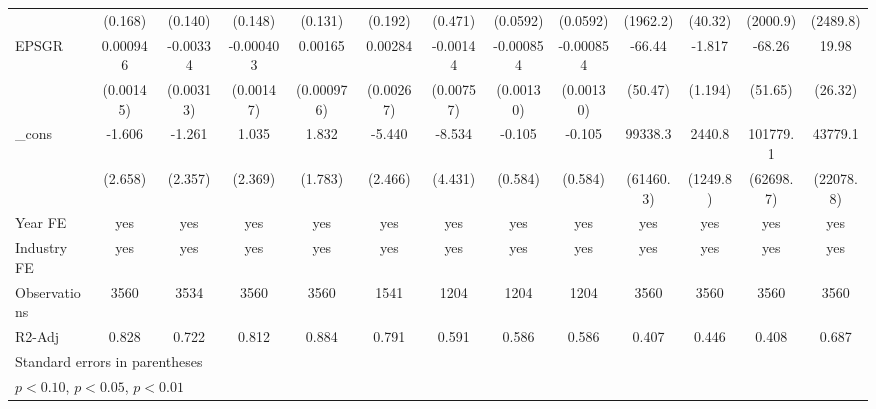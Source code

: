 \begin{table}[htbp]
\begin{tabular}{l*{12}{c}}
                    &     (0.168)         &     (0.140)         &     (0.148)         &     (0.131)         &     (0.192)         &     (0.471)         &    (0.0592)         &    (0.0592)         &    (1962.2)         &     (40.32)         &    (2000.9)         &    (2489.8)         \\
EPSGR               &    0.000946         &    -0.00334         &   -0.000403         &     0.00165         &     0.00284         &    -0.00144         &   -0.000854         &   -0.000854         &      -66.44         &      -1.817         &      -68.26         &       19.98         \\
                    &   (0.00145)         &   (0.00313)         &   (0.00147)         &  (0.000976)         &   (0.00267)         &   (0.00757)         &   (0.00130)         &   (0.00130)         &     (50.47)         &     (1.194)         &     (51.65)         &     (26.32)         \\
\_cons              &      -1.606         &      -1.261         &       1.035         &       1.832         &      -5.440\sym{**} &      -8.534\sym{*}  &      -0.105         &      -0.105         &     99338.3         &      2440.8\sym{*}  &    101779.1         &     43779.1\sym{*}  \\
                    &     (2.658)         &     (2.357)         &     (2.369)         &     (1.783)         &     (2.466)         &     (4.431)         &     (0.584)         &     (0.584)         &   (61460.3)         &    (1249.8)         &   (62698.7)         &   (22078.8)         \\
\hline
Year FE             &         yes         &         yes         &         yes         &         yes         &         yes         &         yes         &         yes         &         yes         &         yes         &         yes         &         yes         &         yes         \\
Industry FE         &         yes         &         yes         &         yes         &         yes         &         yes         &         yes         &         yes         &         yes         &         yes         &         yes         &         yes         &         yes         \\
Observations        &        3560         &        3534         &        3560         &        3560         &        1541         &        1204         &        1204         &        1204         &        3560         &        3560         &        3560         &        3560         \\
R2-Adj              &       0.828         &       0.722         &       0.812         &       0.884         &       0.791         &       0.591         &       0.586         &       0.586         &       0.407         &       0.446         &       0.408         &       0.687         \\
\hline\hline
\multicolumn{13}{l}{\footnotesize Standard errors in parentheses}\\
\multicolumn{13}{l}{\footnotesize \sym{*} \(p<0.10\), \sym{**} \(p<0.05\), \sym{***} \(p<0.01\)}\\
\end{tabular}
\end{table}
